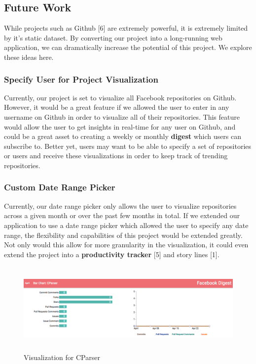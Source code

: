 \documentclass{article}
\begin{document}
\subsection {Future Work}

While projects such as Github [6] are extremely powerful, it is extremely limited by it's static dataset. By converting our project into a long-running web application, we can dramatically increase the potential of this project. We explore these ideas here.

\subsubsection {Specify User for Project Visualization}

Currently, our project is set to visualize all Facebook repositories on Github. However, it would be a great feature if we allowed the user to enter in any username on Github in order to visualize all of their repositories. This feature would allow the user to get insights in real-time for any user on Github, and could be a great asset to creating a weekly or monthly \textbf{digest} which users can subscribe to. Better yet, users may want to be able to specify a set of repositories or users and receive these visualizations in order to keep track of trending repositories.

\subsubsection {Custom Date Range Picker}

Currently, our date range picker only allows the user to visualize repositories across a given month or over the past few months in total. If we extended our application to use a date range picker which allowed the user to specify any date range, the flexibility and capabilities of this project would be extended greatly. Not only would this allow for more granularity in the visualization, it could even extend the project into a \textbf{productivity tracker} [5] and story lines [1].

\begin{figure}[t!]
\centering
\includegraphics[height=4.5cm, width=17cm]{cparse}
\caption{Visualization for CParser}
\end{figure}
\end{document}
